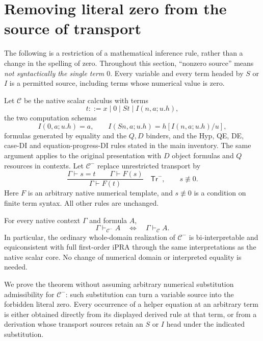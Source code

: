 \section{Removing literal zero from the source of transport}
\label{zs:section}

The following is a restriction of a mathematical inference rule, rather
than a change in the spelling of zero. Throughout this section,
``nonzero source'' means \emph{not syntactically the single term $0$}.
Every variable and every term headed by $S$ or $I$ is a permitted source,
including terms whose numerical value is zero.

Let $\mathcal C$ be the native scalar calculus with terms
\[
 t::=x\mid0\mid St\mid I(n,a;u.h),
\]
the two computation schemas
\[
 I(0,a;u.h)=a,\qquad
 I(Sn,a;u.h)=h[I(n,a;u.h)/u],
\]
formulas generated by equality and the $Q,D$ binders, and the Hyp, QE,
DE, case-DI and equation-progress-DI rules stated in the main inventory.
The same argument applies to the original presentation with $D$ object
formulas and $Q$ resources in contexts. Let $\mathcal C^{-}$ replace
unrestricted transport by
\[
 \frac{\Gamma\vdash s=t\qquad\Gamma\vdash F(s)}
      {\Gamma\vdash F(t)}
 \quad\mathsf{Tr}^{-},\qquad s\not\equiv0.
 \tag{Tr$^-$}\label{zs:restricted-rule}
\]
Here $F$ is an arbitrary native numerical template, and $s\not\equiv0$
is a condition on finite term syntax. All other rules are unchanged.

\begin{theorem}
\label{zs:main}
For every native context $\Gamma$ and formula $A$,
\[
 \Gamma\vdash_{\mathcal C^{-}}A
 \quad\Longleftrightarrow\quad
 \Gamma\vdash_{\mathcal C}A.
\]
In particular, the ordinary whole-domain realization of
$\mathcal C^{-}$ is bi-interpretable and equiconsistent with full
first-order iPRA through the same interpretations as the native scalar
core. No change of numerical domain or interpreted equality is needed.
\end{theorem}

We prove the theorem without assuming arbitrary numerical substitution
admissibility for $\mathcal C^{-}$: such substitution can turn a variable
source into the forbidden literal zero. Every occurrence of a helper
equation at an arbitrary term is either obtained directly from its
displayed derived rule at that term, or from a derivation whose transport
sources retain an $S$ or $I$ head under the indicated substitution.

